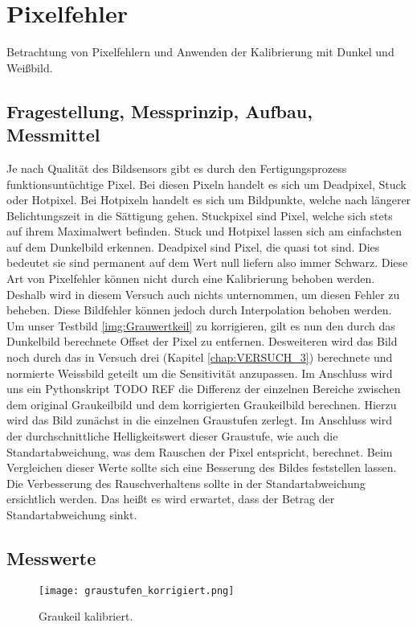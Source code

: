 %
%
\chapter{Pixelfehler}
Betrachtung von Pixelfehlern und Anwenden der Kalibrierung mit Dunkel und Weißbild.
\label{chap:Pixelfehler}

\section{Fragestellung, Messprinzip, Aufbau, Messmittel}
Je nach Qualität des Bildsensors gibt es durch den Fertigungsprozess funktionsuntüchtige Pixel. Bei diesen Pixeln handelt es sich um Deadpixel, Stuck oder Hotpixel. Bei Hotpixeln handelt es sich um Bildpunkte, welche nach längerer Belichtungszeit in die Sättigung gehen. Stuckpixel sind Pixel, welche sich stets auf ihrem Maximalwert befinden. Stuck und Hotpixel lassen sich am einfachsten auf dem Dunkelbild erkennen. Deadpixel sind Pixel, die quasi tot sind. Dies bedeutet sie sind permanent auf dem Wert null liefern also immer Schwarz. Diese Art von Pixelfehler können nicht durch eine Kalibrierung behoben werden. Deshalb wird in diesem Versuch auch nichts unternommen, um diesen Fehler zu beheben. Diese Bildfehler können jedoch durch Interpolation behoben werden.
Um unser Testbild \ref{img:Grauwertkeil} zu korrigieren, gilt es nun den durch das Dunkelbild berechnete Offset der Pixel zu entfernen. Desweiteren wird das Bild noch durch das in Versuch drei (Kapitel \ref{chap:VERSUCH_3}) berechnete und normierte Weissbild geteilt um die Sensitivität anzupassen.
Im Anschluss wird uns ein Pythonskript TODO REF die Differenz der einzelnen Bereiche zwischen dem original Graukeilbild und dem korrigierten Graukeilbild berechnen. Hierzu wird das Bild zunächst in die einzelnen Graustufen zerlegt. Im Anschluss wird der durchschnittliche Helligkeitswert dieser Graustufe, wie auch die Standartabweichung, was dem Rauschen der Pixel entspricht, berechnet. 
Beim Vergleichen dieser Werte sollte sich eine Besserung des Bildes feststellen lassen. Die Verbesserung des Rauschverhaltens sollte in der Standartabweichung ersichtlich werden. Das heißt es wird erwartet, dass der Betrag der Standartabweichung sinkt. 
\label{chap:VERSUCH_4_FRAGESTELLUNG}

\section{Messwerte}
\begin{figure}[H]
\centering
\texttt{[image: graustufen\_korrigiert.png]}
\caption{Graukeil kalibriert.}
\label{img:Graukeil_korrigiert}
\end{figure}


